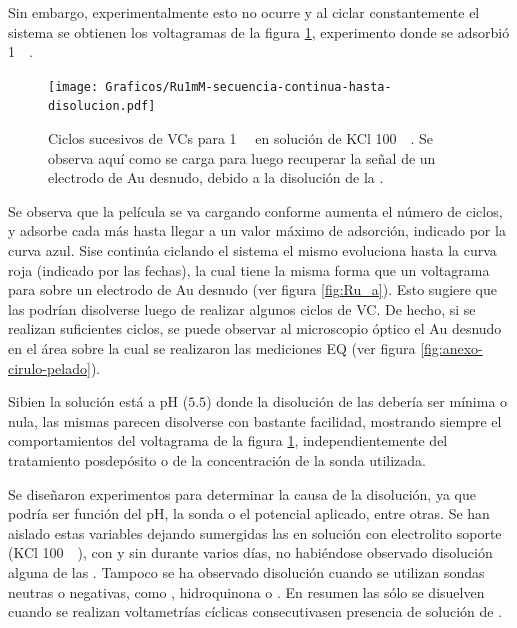 		Sin embargo, experimentalmente esto no ocurre y al ciclar constantemente el sistema se obtienen los voltagramas de la figura \ref{fig:diso_ru1mM}, experimento donde se adsorbió \ru\space \SI{1}{\milli\Molar}. 
				\begin{figure}[h!]
				\centering
		 	    \texttt{[image: Graficos/Ru1mM-secuencia-continua-hasta-disolucion.pdf]}
		        \caption[Disolución de una \pdmF\space en \ru.]{Ciclos sucesivos de VCs para \ru\space \SI{1}{\milli\Molar} en solución de KCl \SI{100}{\milli\Molar}. Se observa aquí como se carga para luego recuperar la señal de un electrodo de Au desnudo, debido a la disolución de la \pdmF.}
		        \label{fig:diso_ru1mM}
		      	\end{figure} 
		\vspace*{1.5mm} Se observa que la película se va cargando conforme aumenta el número de ciclos, y adsorbe cada más \ru\space hasta llegar a un valor máximo de adsorción, indicado por la curva azul. Si\space se continúa ciclando el sistema el mismo evoluciona hasta la curva roja (indicado por las fechas), la cual tiene la misma forma que un voltagrama para \ru\space sobre un electrodo de Au desnudo (ver figura \ref{fig:Ru_a}). Esto sugiere que las \pdmF\space podrían disolverse luego de realizar algunos ciclos de VC. De hecho, si se realizan suficientes ciclos, se puede observar al microscopio óptico el Au desnudo en el área sobre la cual se realizaron las mediciones EQ (ver figura \ref{fig:anexo-cirulo-pelado}).

		Si\space bien la solución está a pH ($5.5$) donde la disolución de las \pdmF\space debería ser mínima o nula, las mismas parecen disolverse con bastante facilidad, mostrando siempre el comportamientos del voltagrama de la figura \ref{fig:diso_ru1mM}, independientemente del tratamiento posdepósito o de la concentración de la sonda utilizada. 

		Se diseñaron experimentos para determinar la causa de la disolución, ya que podría ser función del pH, la sonda o el potencial aplicado, entre otras. Se han aislado estas variables dejando sumergidas las \pdmF\space en solución con electrolito soporte (KCl \SI{100}{\milli\Molar}), con y sin \ru\space durante varios días, no habiéndose observado disolución alguna de las \pdm. Tampoco se ha observado disolución cuando se utilizan sondas neutras o negativas, como \fe, hidroquinona o \fc. En resumen las \pdmF\space sólo se disuelven cuando se realizan voltametrías cíclicas consecutivasen presencia de solución de \ru\space.
		
